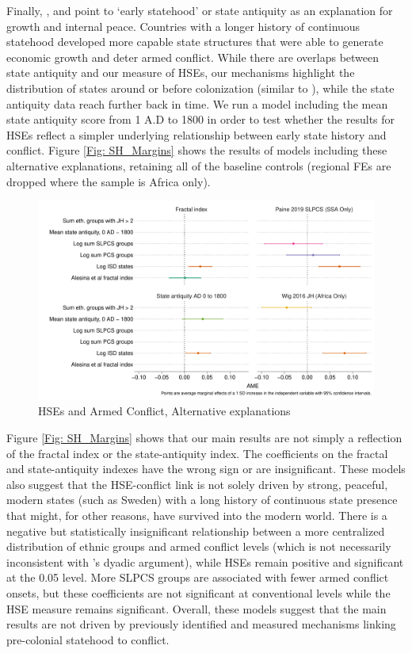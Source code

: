 Finally, \citet{Putterman2008, Hariri2012}, and \citet{Bockstette2012} point to
`early statehood' or state antiquity as an explanation for growth and internal
peace. Countries with a longer history of continuous statehood developed more
capable state structures that were able to generate economic growth and deter
armed conflict. While there are overlaps between state antiquity and our measure
of HSEs, our mechanisms highlight the distribution of states around or before
colonization (similar to \citet{Paine2019}), while the state antiquity data
reach further back in time. We run a model including the mean state antiquity
score from 1 A.D to 1800 in order to test whether the results for HSEs reflect a
simpler underlying relationship between early state history and conflict. Figure
\ref{Fig: SH_Margins} shows the results of models including these alternative
explanations, retaining all of the baseline controls (regional FEs are dropped
where the sample is Africa only). 

\begin{figure}[!htb]
\includegraphics[width=\textwidth,keepaspectratio]{img/margins_state_history.pdf}
\caption{HSEs and Armed Conflict, Alternative explanations} \label{Fig:
SH_Margins} \end{figure}

Figure \ref{Fig: SH_Margins} shows that our main results are not simply a
reflection of the fractal index or the state-antiquity index. The coefficients
on the fractal and state-antiquity indexes have the wrong sign or are
insignificant. These models also suggest that the HSE-conflict link is not solely driven by strong, peaceful, modern states (such as Sweden) with a long history of continuous state presence that might, for other reasons, have survived into the modern world.  There is a negative but statistically insignificant relationship
between a more centralized distribution of ethnic groups and armed conflict
levels (which is not necessarily inconsistent with \citet{Wig2016}'s dyadic
argument), while HSEs remain positive and significant at the 0.05 level. More
SLPCS groups are associated with fewer armed conflict onsets, but these
coefficients are not significant at conventional levels while the HSE measure
remains significant. Overall, these models suggest that the main results are not
driven by previously identified and measured mechanisms linking pre-colonial
statehood to conflict.

